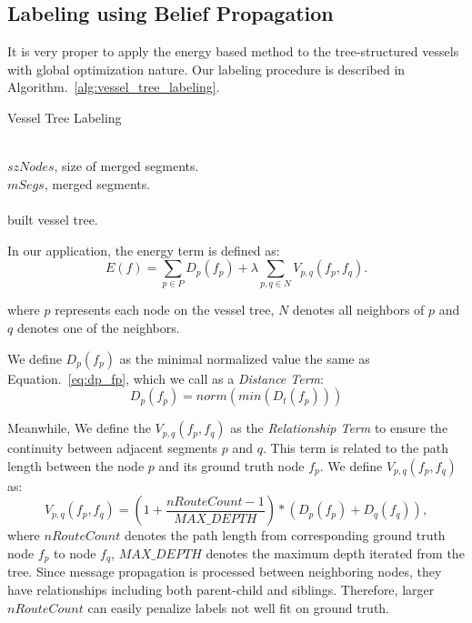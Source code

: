 \documentclass[journal]{IEEEtran}
\begin{document}
\subsection{Labeling using Belief Propagation}
\label{subsec:labeling-using-bp}
It is very proper to apply the energy based method to the tree-structured vessels with global optimization nature. Our labeling procedure is described in Algorithm.~\ref{alg:vessel_tree_labeling}.

\begin{algorithm}
  \caption{Vessel Tree Labeling}
  \label{alg:vessel_tree_labeling}
  \renewcommand{\algorithmicrequire}{\textbf{Input:}}
  \renewcommand{\algorithmicensure}{\textbf{Output:}}
  \begin{algorithmic}[]
  \Require ~~\\
    $szNodes$, size of merged segments.\\
    $mSegs$, merged segments.\\
  \Ensure ~~\\
    built vessel tree.
  \State
   
  \EndFunction
  \State
  \end{algorithmic}
\end{algorithm}

In our application, the energy term is defined as:
\begin{equation}
E(f) = \sum_{p\in P} D_{p}(f_{p}) + \lambda \sum_{p,q \in N} V_{p,q}(f_{p}, f_{q}).
\end{equation}

where $p$ represents each node on the vessel tree, $N$ denotes all neighbors of $p$ and $q$ denotes one of the neighbors.

We define $D_{p}(f_{p})$ as the minimal normalized value the same as Equation.~\ref{eq:dp_fp}, which we call as a \textit{Distance Term}:
\begin{equation}
D_{p}(f_{p}) = norm(min(D_{t}(f_{p})))
\end{equation}

Meanwhile, We define the $V_{p,q}(f_{p}, f_{q})$ as the \textit{Relationship Term} to ensure the continuity between adjacent segments $p$ and $q$. This term is related to the path length between the node $p$ and its ground truth node $f_{p}$. We define $V_{p,q}(f_{p}, f_{q})$ as:
\begin{equation}
V_{p,q}(f_{p}, f_{q}) = (1+\frac{nRouteCount-1}{MAX\_DEPTH})*(D_{p}(f_{p}) + D_{q}(f_{q})),
\end{equation}
where $nRouteCount$ denotes the path length from corresponding ground truth node $f_{p}$ to node $f_{q}$, $MAX\_DEPTH$ denotes the maximum depth iterated from the tree. Since message propagation is processed between neighboring nodes, they have relationships including both parent-child and siblings. Therefore, larger $nRouteCount$ can easily penalize labels not well fit on ground truth.
\end{document}
